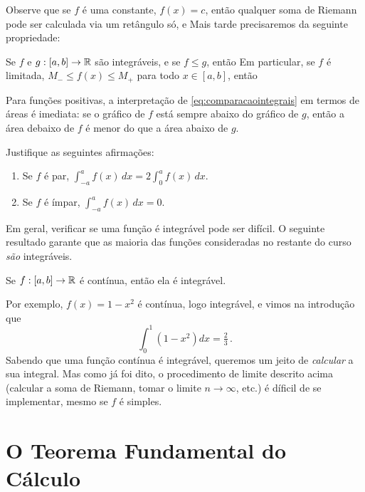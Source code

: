 Observe que se $f$ é uma constante, $f(x)=c$, então qualquer soma de Riemann
pode ser calculada via um retângulo só, e
Mais tarde precisaremos da seguinte propriedade:

\begin{pro} Se $f$ e $g:[a,b]\to \mathbb{R}$ são integráveis,
e se $f\leq g$, então 
Em particular, se $f$ é limitada,
$M_-\leq f(x)\leq M_+$ para todo $x\in [a,b]$, então 
\end{pro}
Para funções positivas, a interpretação de \eqref{eq:comparacaointegrais} em
termos de áreas é imediata: se o gráfico de $f$ está sempre abaixo do gráfico
de $g$, então a área debaixo de $f$ é menor do que a área abaixo de $g$.

\begin{exo}
Justifique as seguintes afirmações:
\begin{enumerate}
\item Se $f$ é par, $\int_{-a}^af(x)\,dx=2\int_0^af(x)\,dx$.
\item Se $f$ é ímpar, $\int_{-a}^af(x)\,dx=0$.
\end{enumerate}
\end{exo}

Em geral, verificar se uma função é integrável pode ser difícil. O seguinte
resultado garante que
as maioria das funções consideradas no restante do
curso \emph{são} integráveis.

\begin{teo}
 Se $f:[a,b] \to \mathbb{R}$ é contínua, então ela é integrável.
\end{teo}

Por exemplo, $f(x)=1-x^2$ é contínua, logo integrável, e vimos na
introdução que
$$\int_0^1(1-x^2)dx=\tfrac23\,.$$
Sabendo que uma função contínua é integrável, queremos um jeito de 
\emph{calcular} a sua integral.
Mas como já foi dito, o procedimento de limite descrito acima (calcular a soma
de Riemann, tomar o limite $n\to \infty$, etc.) é díficil de
se implementar, mesmo se $f$ é simples.

\section{O Teorema Fundamental do Cálculo}\label{Sec:TeoremaFundamental}


